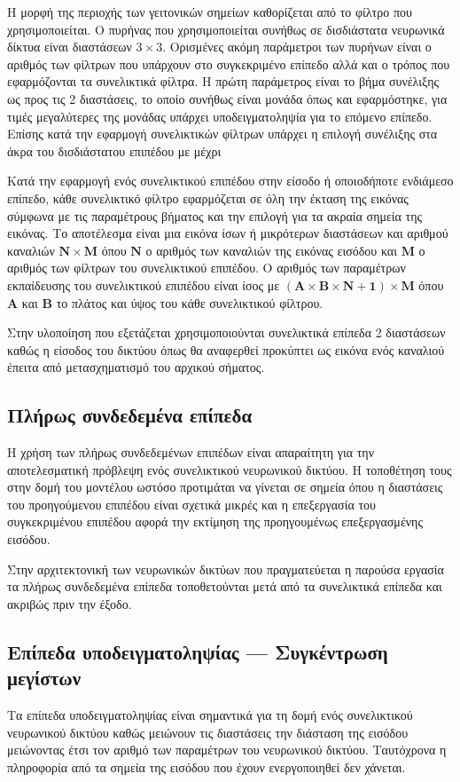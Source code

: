 Η μορφή της περιοχής των γειτονικών σημείων καθορίζεται από το φίλτρο  που χρησιμοποιείται. Ο πυρήνας που χρησιμοποιείται συνήθως σε δισδιάστατα νευρωνικά δίκτυα είναι διαστάσεων $3\times3$. Ορισμένες ακόμη παράμετροι των πυρήνων είναι ο αριθμός των φίλτρων που υπάρχουν στο συγκεκριμένο επίπεδο αλλά και ο τρόπος που εφαρμόζονται τα συνελικτικά φίλτρα. Η πρώτη παράμετρος είναι το βήμα συνέλιξης ως προς τις 2 διαστάσεις, το οποίο συνήθως είναι μονάδα όπως και εφαρμόστηκε, για τιμές μεγαλύτερες της μονάδας υπάρχει υποδειγματοληψία για το επόμενο επίπεδο. Επίσης κατά την εφαρμογή συνελικτικών φίλτρων υπάρχει η επιλογή συνέλιξης στα άκρα του δισδιάστατου επιπέδου με μέχρι 

Κατά την εφαρμογή ενός συνελικτικού επιπέδου στην είσοδο ή οποιοδήποτε ενδιάμεσο επίπεδο, κάθε συνελικτικό φίλτρο εφαρμόζεται σε όλη την έκταση της εικόνας σύμφωνα με τις παραμέτρους βήματος και την επιλογή για τα ακραία σημεία της εικόνας. Το αποτέλεσμα είναι μια εικόνα ίσων ή μικρότερων διαστάσεων και αριθμού καναλιών $\mathbf{N\times M}$ όπου $\mathbf{N}$ ο αριθμός των καναλιών της εικόνας εισόδου και $\mathbf{M}$ ο αριθμός των φίλτρων του συνελικτικού επιπέδου. Ο αριθμός των παραμέτρων εκπαίδευσης του συνελικτικού επιπέδου είναι ίσος με $\mathbf{\left(A \times B\times N+1\right)\times M}$ όπου $\mathbf{A}$ και $\mathbf{B}$ το πλάτος και ύψος του κάθε συνελικτικού φίλτρου.

Στην υλοποίηση που εξετάζεται χρησιμοποιούνται συνελικτικά επίπεδα 2 διαστάσεων καθώς η είσοδος του δικτύου όπως θα αναφερθεί προκύπτει ως εικόνα ενός καναλιού έπειτα από μετασχηματισμό του αρχικού σήματος.

\subsection{Πλήρως συνδεδεμένα επίπεδα}
Η χρήση των πλήρως συνδεδεμένων επιπέδων είναι απαραίτητη για την αποτελεσματική πρόβλεψη ενός συνελικτικού νευρωνικού δικτύου. Η τοποθέτηση τους στην δομή του μοντέλου ωστόσο προτιμάται να γίνεται σε σημεία όπου η διαστάσεις του προηγούμενου επιπέδου είναι σχετικά μικρές και η επεξεργασία του συγκεκριμένου επιπέδου αφορά την εκτίμηση της προηγουμένως επεξεργασμένης εισόδου.

Στην αρχιτεκτονική των νευρωνικών δικτύων που πραγματεύεται η παρούσα εργασία τα πλήρως συνδεδεμένα επίπεδα τοποθετούνται μετά από τα συνελικτικά επίπεδα και ακριβώς πριν την έξοδο.

\subsection{Επίπεδα υποδειγματοληψίας --- Συγκέντρωση μεγίστων }
Τα επίπεδα υποδειγματοληψίας είναι σημαντικά για τη δομή ενός συνελικτικού νευρωνικού δικτύου καθώς μειώνουν τις διαστάσεις την διάσταση της εισόδου μειώνοντας έτσι τον αριθμό των παραμέτρων του νευρωνικού δικτύου. Ταυτόχρονα η πληροφορία από τα σημεία της εισόδου που έχουν ενεργοποιηθεί δεν χάνεται. 

